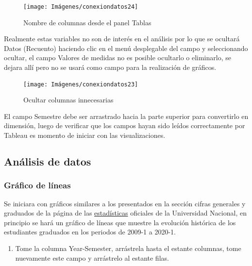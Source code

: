 \documentclass[
]{book}
\providecommand{\tightlist}{%
  \setlength{\itemsep}{0pt}\setlength{\parskip}{0pt}}
\begin{document}
\begin{figure}

{\centering \texttt{[image: Imágenes/conexiondatos24]} 

}

\caption{Nombre de columnas desde el panel Tablas}\label{fig:tablas-fig}
\end{figure}

Realmente estas variables no son de interés en el análisis por lo que se ocultará Datos (Recuento) haciendo clic en el menú desplegable del campo y seleccionando ocultar, el campo Valores de medidas no es posible ocultarlo o eliminarlo, se dejara allí pero no se usará como campo para la realización de gráficos.

\begin{figure}

{\centering \texttt{[image: Imágenes/conexiondatos23]} 

}

\caption{Ocultar columnas innecesarias}\label{fig:ocultarcolumnas-fig}
\end{figure}

El campo Semestre debe ser arrastrado hacia la parte superior para convertirlo en dimensión, luego de verificar que los campos hayan sido leídos correctamente por Tableau es momento de iniciar con las visualizaciones.

\hypertarget{analisisdedatos}{%
\subsection{Análisis de datos}\label{analisisdedatos}}

\hypertarget{graficodelineas}{%
\subsubsection{Gráfico de líneas}\label{graficodelineas}}

Se iniciara con gráficos similares a los presentados en la sección cifras generales y graduados de la página de las \href{http://estadisticas.unal.edu.co/home/}{estadísticas} oficiales de la Universidad Nacional, en principio se hará un gráfico de líneas que muestre la evolución histórica de los estudiantes graduados en los periodos de 2009-1 a 2020-1.

\begin{enumerate}
\def\labelenumi{\arabic{enumi}.}
\tightlist
\item
  Tome la columna Year-Semester, arrástrela hasta el estante columnas, tome nuevamente este campo y arrástrelo al estante filas.
\end{enumerate}
\end{document}
